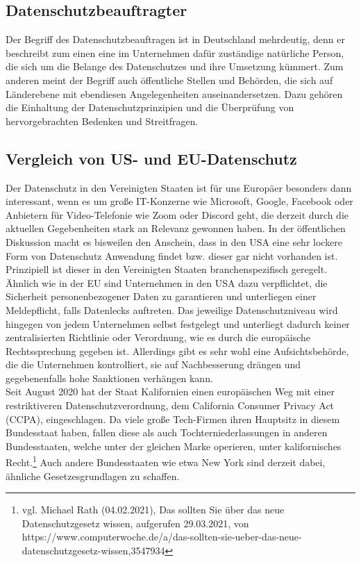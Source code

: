 \subsection{Datenschutzbeauftragter}
    Der Begriff des Datenschutzbeauftragen ist in Deutschland mehrdeutig, denn er beschreibt zum einen eine im Unternehmen dafür zuständige natürliche Person, die sich um die Belange des Datenschutzes und ihre Umsetzung kümmert. Zum anderen meint der Begriff auch öffentliche Stellen und Behörden, die sich auf Länderebene mit ebendiesen Angelegenheiten auseinandersetzen. Dazu gehören die Einhaltung der Datenschutzprinzipien und die Überprüfung von hervorgebrachten Bedenken und Streitfragen.

\subsection{Vergleich von US- und EU-Datenschutz}
    Der Datenschutz in den Vereinigten Staaten ist für uns Europäer besonders dann interessant, wenn es um große IT-Konzerne wie Microsoft, Google, Facebook oder Anbietern für Video-Telefonie wie Zoom oder Discord geht, die derzeit durch die aktuellen Gegebenheiten stark an Relevanz gewonnen haben. In der öffentlichen Diskussion macht es bisweilen den Anschein, dass in den USA eine sehr lockere Form von Datenschutz Anwendung findet bzw. dieser gar nicht vorhanden ist. Prinzipiell ist dieser in den Vereinigten Staaten branchenspezifisch geregelt. Ähnlich wie in der EU sind Unternehmen in den USA dazu verpflichtet, die Sicherheit personenbezogener Daten zu garantieren und unterliegen einer Meldepflicht, falls Datenlecks auftreten. Das jeweilige Datenschutzniveau wird hingegen von jedem Unternehmen selbst festgelegt und unterliegt dadurch keiner zentralisierten Richtlinie oder Verordnung, wie es durch die europäische Rechtssprechung gegeben ist. Allerdings gibt es sehr wohl eine Aufsichtsbehörde, die die Unternehmen kontrolliert, sie auf Nachbesserung drängen und gegebenenfalls hohe Sanktionen verhängen kann.\\
    Seit August 2020 hat der Staat Kalifornien einen \glqq europäischen Weg\grqq{} mit einer restriktiveren Datenschutzverordnung, dem California Consumer Privacy Act (CCPA), eingeschlagen. Da viele große Tech-Firmen ihren Hauptsitz in diesem Bundesstaat haben, fallen diese als auch Tochterniederlassungen in anderen Bundesstaaten, welche unter der gleichen Marke operieren, unter kalifornisches Recht.\footnote{vgl. Michael Rath (04.02.2021), Das sollten Sie über das neue Datenschutzgesetz wissen, aufgerufen 29.03.2021, von https://www.computerwoche.de/a/das-sollten-sie-ueber-das-neue-datenschutzgesetz-wissen,3547934} Auch andere Bundesstaaten wie etwa New York sind derzeit dabei, ähnliche Gesetzesgrundlagen zu schaffen.\\
